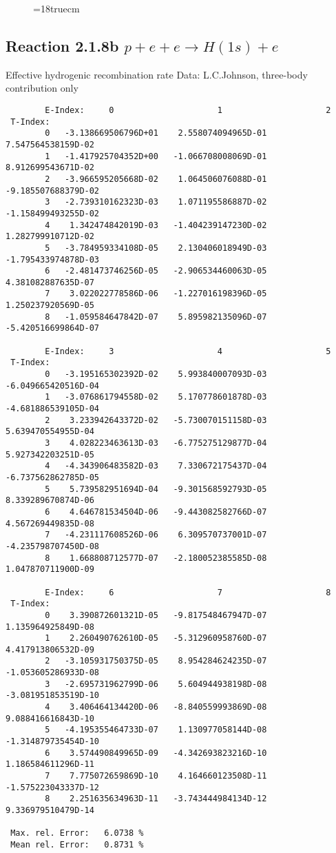 \begin{figure} \label{2.1.8a}
\epsfxsize=18truecm
\end{figure}
\newpage

\subsection{
  Reaction 2.1.8b  $p + e + e \rightarrow H(1s) + e$
}

   Effective hydrogenic recombination rate
   Data: L.C.Johnson, three-body contribution only



\begin{verbatim}
        E-Index:     0                     1                     2
 T-Index:
        0   -3.138669506796D+01    2.558074094965D-01    7.547564538159D-02
        1   -1.417925704352D+00   -1.066708008069D-01    8.912699543671D-02
        2   -3.966595205668D-02    1.064506076088D-01   -9.185507688379D-02
        3   -2.739310162323D-03    1.071195586887D-02   -1.158499493255D-02
        4    1.342474842019D-03   -1.404239147230D-02    1.282799910712D-02
        5   -3.784959334108D-05    2.130406018949D-03   -1.795433974878D-03
        6   -2.481473746256D-05   -2.906534460063D-05    4.381082887635D-07
        7    3.022022778586D-06   -1.227016198396D-05    1.250237920569D-05
        8   -1.059584647842D-07    5.895982135096D-07   -5.420516699864D-07

        E-Index:     3                     4                     5
 T-Index:
        0   -3.195165302392D-02    5.993840007093D-03   -6.049665420516D-04
        1   -3.076861794558D-02    5.170778601878D-03   -4.681886539105D-04
        2    3.233942643372D-02   -5.730070151158D-03    5.639470554955D-04
        3    4.028223463613D-03   -6.775275129877D-04    5.927342203251D-05
        4   -4.343906483582D-03    7.330672175437D-04   -6.737562862785D-05
        5    5.739582951694D-04   -9.301568592793D-05    8.339289670874D-06
        6    4.646781534504D-06   -9.443082582766D-07    4.567269449835D-08
        7   -4.231117608526D-06    6.309570737001D-07   -4.235798707450D-08
        8    1.668808712577D-07   -2.180052385585D-08    1.047870711900D-09

        E-Index:     6                     7                     8
 T-Index:
        0    3.390872601321D-05   -9.817548467947D-07    1.135964925849D-08
        1    2.260490762610D-05   -5.312960958760D-07    4.417913806532D-09
        2   -3.105931750375D-05    8.954284624235D-07   -1.053605286933D-08
        3   -2.695731962799D-06    5.604944938198D-08   -3.081951853519D-10
        4    3.406464134420D-06   -8.840559993869D-08    9.088416616843D-10
        5   -4.195355464733D-07    1.130977058144D-08   -1.314879735454D-10
        6    3.574490849965D-09   -4.342693823216D-10    1.186584611296D-11
        7    7.775072659869D-10    4.164660123508D-11   -1.575223043337D-12
        8    2.251635634963D-11   -3.743444984134D-12    9.336979510479D-14

 Max. rel. Error:   6.0738 %
 Mean rel. Error:   0.8731 %



\end{verbatim}
